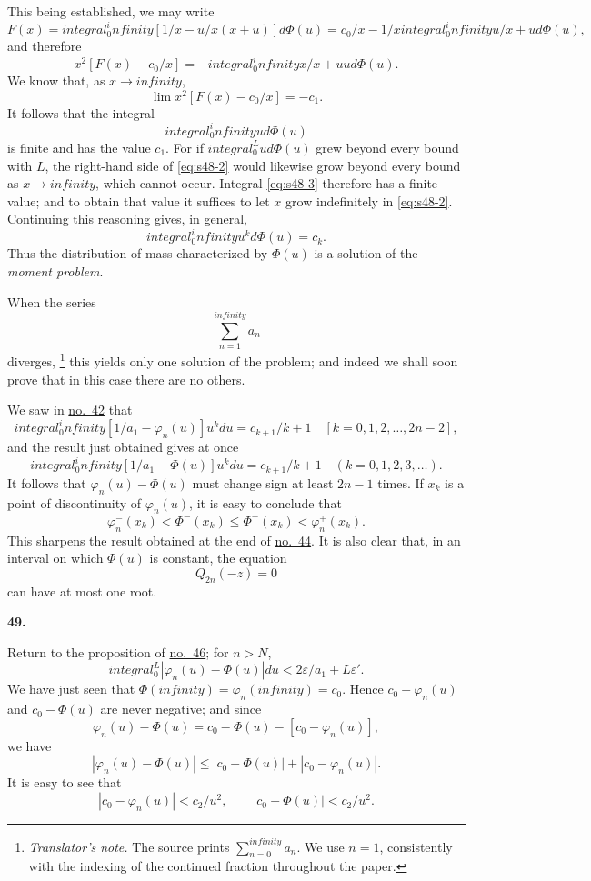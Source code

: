 \documentclass[
  paper=b5,
  fontsize=13pt,
  twoside,
  headings=normal,
  bookmarkpackage=false
]{scrartcl}
\theoremstyle{stieltjesplain}
\theoremstyle{stieltjesdefinition}
\newcommand{\translatornote}[1]{%
  \footnote{\textit{Translator's note.} #1}%
}
\def\int{integral}%
\def\frac#1#2{#1/#2}%
\def\infty{infinity}%
\def\,{ }%
\newcommand{\origsection}[1]{%
  \par\addvspace{0.85\baselineskip}%
  \phantomsection\label{sec:#1}%
  \addcontentsline{toc}{subsection}{\texorpdfstring{\S~#1}{Section #1}}%
  \noindent\textbf{#1.}\quad\ignorespaces
}
\begin{document}
This being established, we may write
\[
 F(x)=\int_0^\infty
 \left[\frac1x-\frac{u}{x(x+u)}\right]d\Phi(u)
 =\frac{c_0}{x}-\frac1x\int_0^\infty\frac{u}{x+u}\,d\Phi(u),
\]
and therefore
\begin{equation}
 x^2\left[F(x)-\frac{c_0}{x}\right]
 =-\int_0^\infty\frac{x}{x+u}\,u\,d\Phi(u).
 \tag{2}\label{eq:s48-2}
\end{equation}
We know that, as $x\to\infty$,
\[
 \lim x^2\left[F(x)-\frac{c_0}{x}\right]=-c_1.
\]
It follows that the integral
\begin{equation}
 \int_0^\infty u\,d\Phi(u)
 \tag{3}\label{eq:s48-3}
\end{equation}
is finite and has the value $c_1$. For if $\int_0^L u\,d\Phi(u)$ grew beyond every bound with $L$, the right-hand side of \eqref{eq:s48-2} would likewise grow beyond every bound as $x\to\infty$, which cannot occur. Integral \eqref{eq:s48-3} therefore has a finite value; and to obtain that value it suffices to let $x$ grow indefinitely in \eqref{eq:s48-2}. Continuing this reasoning gives, in general,
\[
 \int_0^\infty u^k\,d\Phi(u)=c_k.
\]
Thus the distribution of mass characterized by $\Phi(u)$ is a solution of the \emph{moment problem}.

When the series
\[
 \sum_{n=1}^{\infty}a_n
\]
diverges,\translatornote{The source prints $\sum_{n=0}^{\infty}a_n$. We use $n=1$, consistently with the indexing of the continued fraction throughout the paper.} this yields only one solution of the problem; and indeed we shall soon prove that in this case there are no others.

We saw in \hyperref[sec:42]{no.~42} that
\[
 \int_0^\infty\left[\frac1{a_1}-\varphi_n(u)\right]u^k\,du
 =\frac{c_{k+1}}{k+1}
 \quad[k=0,1,2,\ldots,2n-2],
\]
and the result just obtained gives at once
\[
 \int_0^\infty\left[\frac1{a_1}-\Phi(u)\right]u^k\,du
 =\frac{c_{k+1}}{k+1}
 \quad(k=0,1,2,3,\ldots).
\]
It follows that $\varphi_n(u)-\Phi(u)$ must change sign at least $2n-1$ times. If $x_k$ is a point of discontinuity of $\varphi_n(u)$, it is easy to conclude that
\[
 \varphi_n^{-}(x_k)<\Phi^{-}(x_k)
 \leq\Phi^{+}(x_k)<\varphi_n^{+}(x_k).
\]
This sharpens the result obtained at the end of \hyperref[sec:44]{no.~44}. It is also clear that, in an interval on which $\Phi(u)$ is constant, the equation
\[
 Q_{2n}(-z)=0
\]
can have at most one root.

\origsection{49}
Return to the proposition of \hyperref[sec:46]{no.~46}; for $n>N$,
\[
 \int_0^L|\varphi_n(u)-\Phi(u)|\,du
 <\frac{2\varepsilon}{a_1}+L\varepsilon'.
\]
We have just seen that $\Phi(\infty)=\varphi_n(\infty)=c_0$. Hence $c_0-\varphi_n(u)$ and $c_0-\Phi(u)$ are never negative; and since
\[
 \varphi_n(u)-\Phi(u)
 =c_0-\Phi(u)-[c_0-\varphi_n(u)],
\]
we have
\[
 |\varphi_n(u)-\Phi(u)|
 \leq|c_0-\Phi(u)|+|c_0-\varphi_n(u)|.
\]
It is easy to see that
\[
 |c_0-\varphi_n(u)|<\frac{c_2}{u^2},
 \qquad
 |c_0-\Phi(u)|<\frac{c_2}{u^2}.
\]
\end{document}
